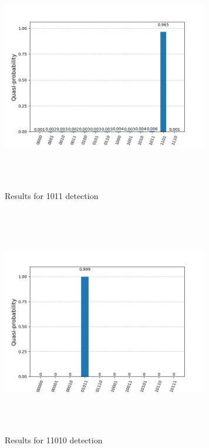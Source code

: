 \documentclass[conference]{IEEEtran}
\begin{document}
\begin{figure}[htbp]
	\centerline{\includegraphics[width=9cm,height=10cm,keepaspectratio]{4_qubit.png}}
	\caption{Results for 1011 detection}
	\label{fig:4_qubit}
\end{figure}


\begin{figure}[htbp]
	\centerline{\includegraphics[width=9cm,height=10cm,keepaspectratio]{5_qubit.png}}
	\caption{Results for 11010 detection}
	\label{fig:5_qubit}
\end{figure}
\end{document}
